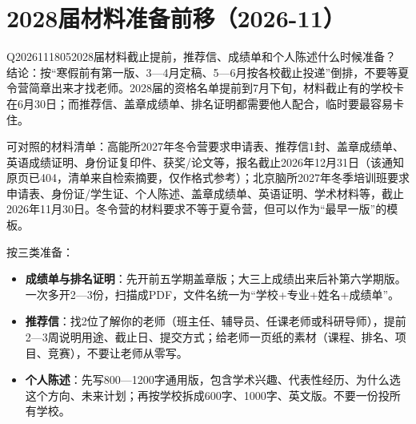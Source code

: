 \section{2028届材料准备前移（2026-11）}

\begin{qa}{Q2026111805}{2028届材料截止提前，推荐信、成绩单和个人陈述什么时候准备？}
结论：按“寒假前有第一版、3—4月定稿、5—6月按各校截止投递”倒排，不要等夏令营简章出来才找老师。2028届的资格名单提前到7月下旬，材料截止有的学校卡在6月30日；而推荐信、盖章成绩单、排名证明都需要他人配合，临时要最容易卡住。

可对照的材料清单：高能所2027年冬令营要求申请表、推荐信1封、盖章成绩单、英语成绩证明、身份证复印件、获奖/论文等，报名截止2026年12月31日（该通知原页已404，清单来自检索摘要，仅作格式参考）；北京脑所2027年冬季培训班要求申请表、身份证/学生证、个人陈述、盖章成绩单、英语证明、学术材料等，截止2026年11月30日。冬令营的材料要求不等于夏令营，但可以作为“最早一版”的模板。

按三类准备：

\begin{itemize}
\item \textbf{成绩单与排名证明}：先开前五学期盖章版；大三上成绩出来后补第六学期版。一次多开2—3份，扫描成PDF，文件名统一为“学校+专业+姓名+成绩单”。
\item \textbf{推荐信}：找2位了解你的老师（班主任、辅导员、任课老师或科研导师），提前2—3周说明用途、截止日、提交方式；给老师一页纸的素材（课程、排名、项目、竞赛），不要让老师从零写。
\item \textbf{个人陈述}：先写800—1200字通用版，包含学术兴趣、代表性经历、为什么选这个方向、未来计划；再按学校拆成600字、1000字、英文版。不要一份投所有学校。
\end{itemize}
\end{qa}
